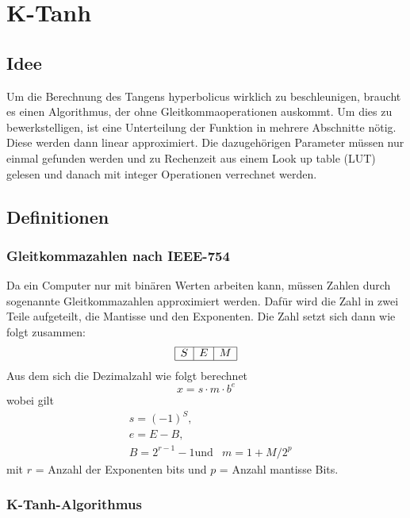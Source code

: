 %
%
%
\section{K-Tanh
\label{transfer:section:teil4}}

\subsection{Idee
	\label{transfer:subsection:Ktanh-Idee}}
Um die Berechnung des Tangens hyperbolicus wirklich zu beschleunigen, braucht es einen Algorithmus, der ohne Gleitkommaoperationen auskommt. Um dies zu bewerkstelligen, ist eine Unterteilung der Funktion in mehrere Abschnitte nötig. Diese werden dann linear approximiert. Die dazugehörigen Parameter müssen nur einmal gefunden werden und zu Rechenzeit aus einem Look up table (LUT) gelesen und danach mit integer Operationen verrechnet werden.


\subsection{Definitionen
	\label{transfer:subsection:Ktanh-Definition}}

\subsubsection{Gleitkommazahlen nach IEEE-754
	\label{transfer:subsection:Ktanh-Algorithmus:Gleitkommazahl}}
Da ein Computer nur mit binären Werten arbeiten kann, müssen Zahlen durch sogenannte Gleitkommazahlen approximiert werden. Dafür wird die Zahl in zwei Teile aufgeteilt, die Mantisse und den Exponenten. Die Zahl setzt sich dann wie folgt zusammen:
$$
\begin{array}{|l|l|l|}
	\hline S & E & M \\
	\hline
\end{array}
$$
Aus dem sich die Dezimalzahl wie folgt berechnet
$$
x=s \cdot m \cdot b^{e}
$$
wobei gilt
$$
\begin{aligned}
	&s=(-1)^{S}, \\
	&e=E-B,\\
	&B=2^{r-1}-1 \text{und}
	&m=1+M / 2^{p}
\end{aligned}
$$
mit $r$ = Anzahl der Exponenten bits und $p$ = Anzahl mantisse Bits.


\subsubsection{K-Tanh-Algorithmus
\label{transfer:subsection:Ktanh-Algorithmus}}
\cite{transfer:DBLP:journals/corr/abs-1909-07729}

